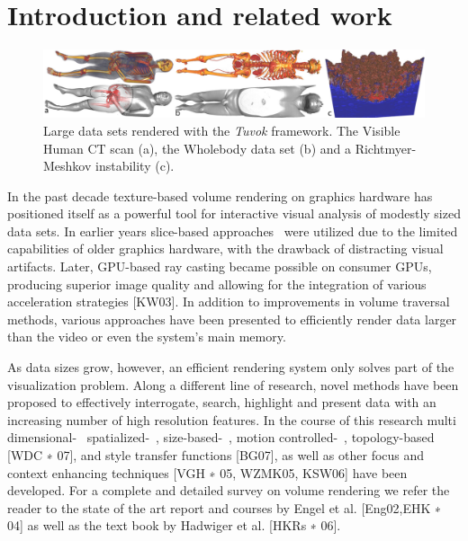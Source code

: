 \section{Introduction and related work}

\begin{figure}
	\includegraphics[width=\linewidth]{images/arch/vh-rm}

  \caption{Large data sets rendered with the \textit{Tuvok} framework.
  The Visible Human CT scan (a), the Wholebody data set (b) and a
  Richtmyer-Meshkov instability (c).}
	\label{fig:tvktease}
\end{figure}

In the past decade texture-based volume rendering on graphics hardware
has positioned itself as a powerful tool for interactive visual
analysis of modestly sized data sets. In earlier years slice-based
approaches~\cite{Cullip:1993:AVRW, Cabral:1994:AVRA} were utilized
due to the limited capabilities of older graphics hardware, with the
drawback of distracting visual artifacts. Later, GPU-based ray casting
became possible on consumer GPUs, producing superior image quality
and allowing for the integration of various acceleration strategies
[KW03]. In addition to improvements in volume traversal methods,
various approaches have been presented to efficiently render data
larger than the video or even the system's main memory.

As data sizes grow, however, an efficient rendering system only solves
part of the visualization problem. Along a different line of research,
novel methods have been proposed to effectively interrogate, search,
highlight and present data with an increasing number of high resolution
features. In the course of this research multi
dimensional-~\cite{Kniss:2005:Multidim}
spatialized-~\cite{Roettger:2005:Spatialized},
size-based-~\cite{Correa:2008:Size-based}, motion
controlled-~\cite{Correa:2005:Motion}, topology-based [WDC ∗ 07],
and style transfer functions [BG07], as well as other focus and
context enhancing techniques [VGH ∗ 05, WZMK05, KSW06] have been
developed. For a complete and detailed survey on volume rendering we
refer the reader to the state of the art report and courses by Engel
et al. [Eng02,EHK ∗ 04] as well as the text book by Hadwiger et
al. [HKRs ∗ 06].


